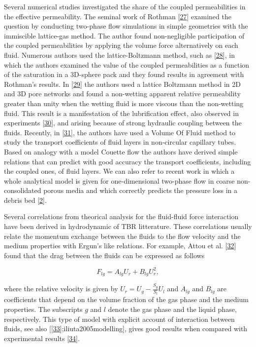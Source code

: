 \documentclass[]{article}
\begin{document}
Several numerical studies investigated the share of the coupled
permeabilities in the effective permeability. The seminal work of
Rothman {[}\protect\hyperlink{ref-Rothman1990}{27}{]} examined the
question by conducting two-phase flow simulations in simple geometries
with the immiscible lattice-gas method. The author found non-negligible
participation of the coupled permeabilities by applying the volume force
alternatively on each fluid. Numerous authors used the lattice-Boltzmann
method, such as {[}\protect\hyperlink{ref-Li2005}{28}{]}, in which the
authors examined the value of the coupled permeabilities as a function
of the saturation in a 3D-sphere pack and they found results in
agreement with Rothman's results. In
{[}\protect\hyperlink{ref-Yiotis2007}{29}{]} the authors used a lattice
Boltzmann method in 2D and 3D pore networks and found a non-wetting
apparent relative permeability greater than unity when the wetting fluid
is more viscous than the non-wetting fluid. This result is a
manifestation of the lubrification effect, also observed in experiments
{[}\protect\hyperlink{ref-odeh1959effect}{30}{]}, and arising because of
strong hydraulic coupling between the fluids. Recently, in
{[}\protect\hyperlink{ref-shams2018study}{31}{]}, the authors have used
a Volume Of Fluid method to study the transport coefficients of fluid
layers in non-circular capillary tubes. Based on analogy with a model
Couette flow the authors have derived simple relations that can predict
with good accuracy the transport coefficients, including the coupled
ones, of fluid layers. We can also refer to recent work in which a whole
analytical model is given for one-dimensional two-phase flow in coarse
non-consolidated porous media and which correctly predicts the pressure
loss in a debris bed
{[}\protect\hyperlink{ref-clavier2017modeling}{2}{]}.

Several correlations from theorical analysis for the fluid-fluid force
interaction have been derived in hydrodynamic of TBR litterature. These
correlations usually relate the momentum exchange between the fluids to
the flow velocity and the medium properties with Ergun's like relations.
For example, Attou et al. {[}\protect\hyperlink{ref-Attou1999}{32}{]}
found that the drag between the fluids can be expressed as follows

\[
F_{lg} = A_{lg} U_r + B_{lg} U_r^2,
\]

where the relative velocity is given by \(U_r=U_g-\frac{S_g}{S_l}U_l\)
and \(A_{lg}\) and \(B_{lg}\) are coefficients that depend on the volume
fraction of the gas phase and the medium properties. The subscripts
\(g\) and \(l\) denote the gas phase and the liquid phase, respectively.
This type of model with explicit account of interaction between fluids,
see also
{[}{[}\protect\hyperlink{ref-tung1988hydrodynamic}{33}{]};iliuta2005modelling{]},
gives good results when compared with experimental results
{[}\protect\hyperlink{ref-wang2013modelling}{34}{]}.
\end{document}
